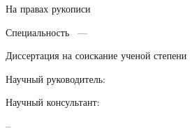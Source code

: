 
\thispagestyle{empty}

\begin{center}
\dissorg
\par
\end{center}

\vspace{10mm}
\begin{flushright}
На правах рукописи

{\sl \dissudk}
\end{flushright}

\vspace{20mm}
\begin{center}
{\large \dissauthor}
\end{center}

\vspace{5mm}
\begin{center}
{\bf \large \disstitle
\par}

\vspace{10mm}
{%
Специальность \specnum~---

\specname
}

\vspace{10mm}
Диссертация на соискание ученой степени

\edudegree
\end{center}

\vspace{5mm}
\begin{flushright}
Научный руководитель:

\mentordegree

\mentorname
\end{flushright}

\begin{flushright}
Научный консультант:

\consultantdegree

\consultantname

\end{flushright}

\vfill
\begin{center}
{\disscity -- \dissyear}
\end{center}

